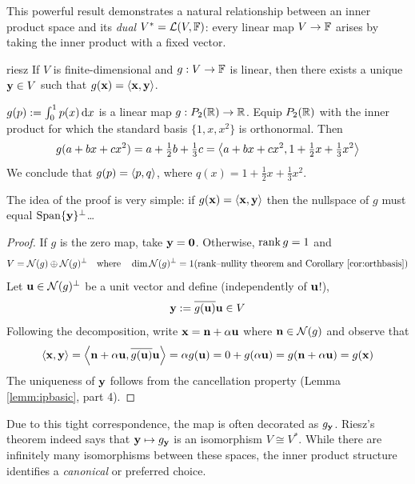 


This powerful result demonstrates a natural relationship between an inner product space and its \emph{dual} $V^*=\mathcal{L}(V,\mathbb{F})$: every linear map $V\to\mathbb{F}$ arises by taking the inner product with a fixed vector.


\begin{thm}{}{riesz}
	If $V$ is finite-dimensional and $g:V\to\mathbb{F}$ is linear, then there exists a unique ${\mathbf{y}}\in V$ such that $g({\mathbf{x}})=\left\langle {\mathbf{x}},{\mathbf{y}}\right\rangle$.
\end{thm}

\begin{example}{}{}
	$g(p):=\int_0^1p(x)\,{\mathrm{d} x}$ is a linear map $g:P_2(\mathbb{R})\to \mathbb{R}$. Equip $P_2(\mathbb{R})$ with the inner product for which the standard basis $\{1,x,x^2\}$ is orthonormal. Then
	\[g(a+bx+cx^2)=a+\tfrac 12b+\tfrac 13c=\left\langle a+bx+cx^2,1+\tfrac 12x+\tfrac 13x^2\right\rangle\]
	We conclude that $g(p)=\left\langle p,q\right\rangle$, where $q(x)=1+\frac 12x+\frac 13x^2$.
\end{example}

The idea of the proof is very simple: if $g({\mathbf{x}})=\left\langle {\mathbf{x}},{\mathbf{y}}\right\rangle$ then the nullspace of $g$ must equal $\operatorname{Span}\{{\mathbf{y}}\}^\perp$\ldots

\begin{proof}
	If $g$ is the zero map, take ${\mathbf{y}}=\mathbf{0}$. Otherwise, $\operatorname{rank} g=1$ and
	\[
		V=\cN(g)\oplus \cN(g)^\perp\quad\text{where}\quad\dim\cN(g)^\perp=1\hfill (\text{rank--nullity theorem and Corollary \ref{cor:orthbasis}})
	\]
	Let ${\mathbf{u}}\in \mathcal{N}(g)^\perp$ be a unit vector and define (independently of ${\mathbf{u}}$!),
	\[
		{\mathbf{y}}:=\overline{g({\mathbf{u}})}{\mathbf{u}}\in V
	\]
	Following the decomposition, write ${\mathbf{x}}={\mathbf{n}}+\alpha{\mathbf{u}}$ where ${\mathbf{n}}\in\mathcal{N}(g)$ and observe that
	\[
		\left\langle {\mathbf{x}},{\mathbf{y}}\right\rangle =\left\langle {\mathbf{n}}+\alpha{\mathbf{u}},\overline{g({\mathbf{u}})}{\mathbf{u}}\right\rangle 
		=\alpha g({\mathbf{u}}) =0+g(\alpha{\mathbf{u}}) 
		=g({\mathbf{n}}+\alpha{\mathbf{u}}) =g({\mathbf{x}})
	\]
	The uniqueness of ${\mathbf{y}}$ follows from the cancellation property (Lemma \ref{lemm:ipbasic}, part 4).
\end{proof}

Due to this tight correspondence, the map is often decorated as $g_{\mathbf{y}}$. Riesz's theorem indeed says that ${\mathbf{y}}\mapsto g_{\mathbf{y}}$ is an isomorphism $V\cong V^*$. While there are infinitely many isomorphisms between these spaces, the inner product structure identifies a \emph{canonical} or preferred choice.

